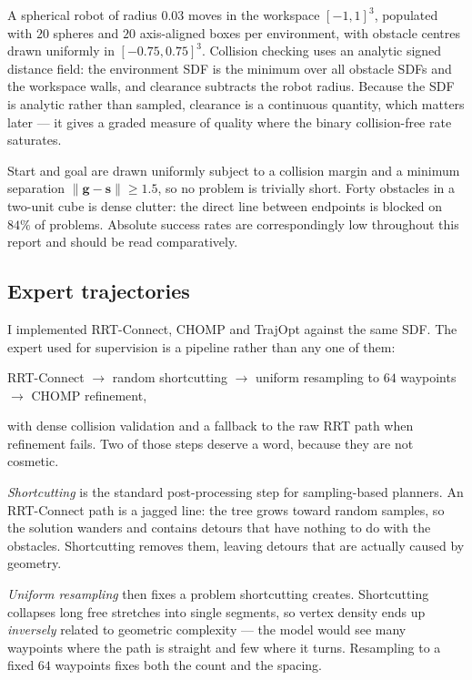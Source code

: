\documentclass[11pt,a4paper]{article}
\newcommand{\svec}{\mathbf{s}}
\newcommand{\gvec}{\mathbf{g}}
\begin{document}
A spherical robot of radius $0.03$ moves in the workspace $[-1,1]^3$, populated
with $20$ spheres and $20$ axis-aligned boxes per environment, with obstacle
centres drawn uniformly in $[-0.75, 0.75]^3$. Collision checking uses an analytic
signed distance field: the environment SDF is the minimum over all obstacle SDFs
and the workspace walls, and clearance subtracts the robot radius. Because the
SDF is analytic rather than sampled, clearance is a continuous quantity, which
matters later --- it gives a graded measure of quality where the binary
collision-free rate saturates.

Start and goal are drawn uniformly subject to a collision margin and a minimum
separation $\|\gvec - \svec\| \ge 1.5$, so no problem is trivially short. Forty
obstacles in a two-unit cube is dense clutter: the direct line between endpoints
is blocked on $84\%$ of problems. Absolute success rates are correspondingly low
throughout this report and should be read comparatively.

\subsection{Expert trajectories}

I implemented RRT-Connect, CHOMP and TrajOpt against the same SDF. The expert
used for supervision is a pipeline rather than any one of them:

\begin{center}
RRT-Connect $\rightarrow$ random shortcutting $\rightarrow$ uniform resampling to
$64$ waypoints $\rightarrow$ CHOMP refinement,
\end{center}

\noindent
with dense collision validation and a fallback to the raw RRT path when
refinement fails. Two of those steps deserve a word, because they are not
cosmetic.

\emph{Shortcutting} is the standard post-processing step for sampling-based
planners. An RRT-Connect path is a jagged line: the tree grows toward random
samples, so the solution wanders and contains detours that have nothing to do
with the obstacles. Shortcutting removes them, leaving detours that are actually
caused by geometry.

\emph{Uniform resampling} then fixes a problem shortcutting creates. Shortcutting
collapses long free stretches into single segments, so vertex density ends up
\emph{inversely} related to geometric complexity --- the model would see many
waypoints where the path is straight and few where it turns. Resampling to a
fixed $64$ waypoints fixes both the count and the spacing.
\end{document}
